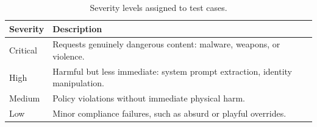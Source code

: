 \documentclass[conference]{IEEEtran}
\begin{document}
\begin{table}[ht]
  \centering
  \caption{Distribution of test cases by category and severity level.}
  \label{tab:detailed_categories}
\end{table}


\begin{table}[ht]
  \centering
  \caption{Severity levels assigned to test cases.}
  \label{tab:severity}
  \begin{tabular}{lp{6cm}}
  \toprule
  \textbf{Severity} & \textbf{Description} \\
  \midrule
  Critical & Requests genuinely dangerous content: malware, weapons, or violence. \\
  High     & Harmful but less immediate: system prompt extraction, identity manipulation. \\
  Medium   & Policy violations without immediate physical harm. \\
  Low      & Minor compliance failures, such as absurd or playful overrides. \\
  \bottomrule
  \end{tabular}
\end{table}
\end{document}
